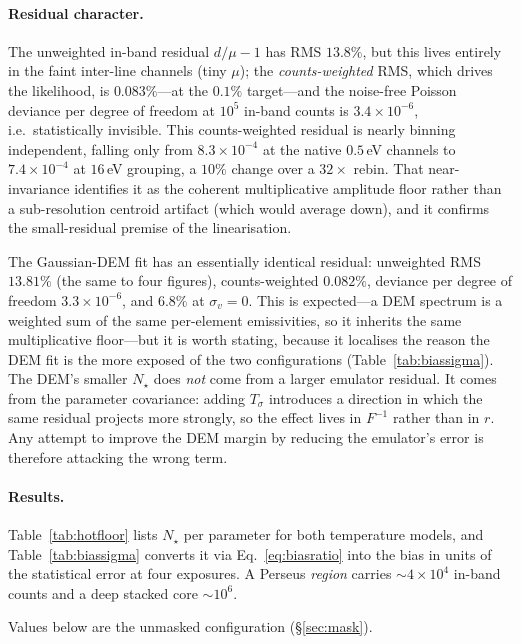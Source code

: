 \documentclass[11pt,a4paper]{article}
\begin{document}
\paragraph{Residual character.} The unweighted in-band residual $d/\mu-1$ has
RMS $13.8\%$, but this lives entirely in the faint inter-line channels (tiny
$\mu$); the \emph{counts-weighted} RMS, which drives the likelihood, is
$0.083\%$---at the $0.1\%$ target---and the noise-free Poisson deviance per
degree of freedom at $10^5$ in-band counts is $3.4\times10^{-6}$, i.e.\
statistically invisible. This counts-weighted residual is nearly binning
independent, falling only from $8.3\times10^{-4}$ at the native $0.5\,$eV
channels to $7.4\times10^{-4}$ at $16\,$eV grouping, a $10\%$ change over a
$32\times$ rebin. That near-invariance identifies it as the coherent
multiplicative amplitude floor rather than a sub-resolution centroid artifact
(which would average down), and it confirms the small-residual premise of the
linearisation.

The Gaussian-DEM fit has an essentially identical residual: unweighted RMS
$13.81\%$ (the same to four figures), counts-weighted $0.082\%$, deviance per
degree of freedom $3.3\times10^{-6}$, and $6.8\%$ at $\sigma_v=0$. This is
expected---a DEM spectrum is a weighted sum of the same per-element
emissivities, so it inherits the same multiplicative floor---but it is worth
stating, because it localises the reason the DEM fit is the more exposed of the
two configurations (Table~\ref{tab:biassigma}). The DEM's smaller $N_\star$ does
\emph{not} come from a larger emulator residual. It comes from the parameter
covariance: adding $T_\sigma$ introduces a direction in which the same residual
projects more strongly, so the effect lives in $F^{-1}$ rather than in $r$. Any
attempt to improve the DEM margin by reducing the emulator's error is therefore
attacking the wrong term.

\paragraph{Results.} Table~\ref{tab:hotfloor} lists $N_\star$ per parameter for
both temperature models, and Table~\ref{tab:biassigma} converts it via
Eq.~\eqref{eq:biasratio} into the bias in units of the statistical error at
four exposures. A Perseus \emph{region} carries $\sim4\times10^4$ in-band counts
and a deep stacked core $\sim10^6$.

Values below are the unmasked configuration (\S\ref{sec:mask}).
\end{document}
